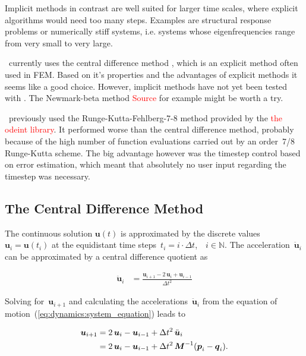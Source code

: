 Implicit methods in contrast are well suited for larger time scales, where explicit algorithms would need too many steps.
Examples are structural response problems or numerically stiff systems, i.e. systems whose eigenfrequencies range from very small to very large.

\swtitle\ currently uses the central difference method \cite{bib:dynamic_solution}, which is an explicit method often used in FEM.
Based on it's properties and the advantages of explicit methods it seems like a good choice.
However, implicit methods have not yet been tested with \swtitle. The Newmark-beta method \textcolor{red}{Source} for example might be worth a try.

\swtitle\ previously used the Runge-Kutta-Fehlberg-7-8 method provided by the \textcolor{red}{the odeint library}.
It performed worse than the central difference method, probably because of the high number of function evaluations carried out by an order~7/8 Runge-Kutta scheme.
The big advantage however was the timestep control based on error estimation, which meant that absolutely no user input regarding the timestep was necessary.

\subsection{The Central Difference Method}

The continuous solution $\boldsymbol{u}(t)$ is approximated by the discrete values~$\boldsymbol{u}_i = \boldsymbol{u}(t_{i})$ at the equidistant time steps~$t_i = i\cdot\Delta t$,\ \ $i \in \mathbb{N}$.
The acceleration~$\ddot{\boldsymbol{u}}_i$ can be approximated by a central difference quotient as

\begin{align}
\ddot{\boldsymbol{u}}_i &= \frac{\boldsymbol{u}_{i+1} - 2\,\boldsymbol{u}_{i} + \boldsymbol{u}_{i-1}}{\Delta t^2}\label{eq:dynamics:difference_acceleration}
\end{align}

Solving for~$\boldsymbol{u}_{i+1}$ and calculating the accelerations~$\ddot{\boldsymbol{u}}_{i}$ from the equation of motion~(\ref{eq:dynamics:system_equation}) leads to

\begin{align}
\boldsymbol{u}_{i+1} &= 2\,\boldsymbol{u}_{i} - \boldsymbol{u}_{i-1} + \Delta t^2\,\ddot{\boldsymbol{u}}_{i}\notag\\
&= 2\,\boldsymbol{u}_{i} - \boldsymbol{u}_{i-1} + \Delta t^2\,\boldsymbol{M}^{-1}(\boldsymbol{p}_i - \boldsymbol{q}_i).
\end{align}

